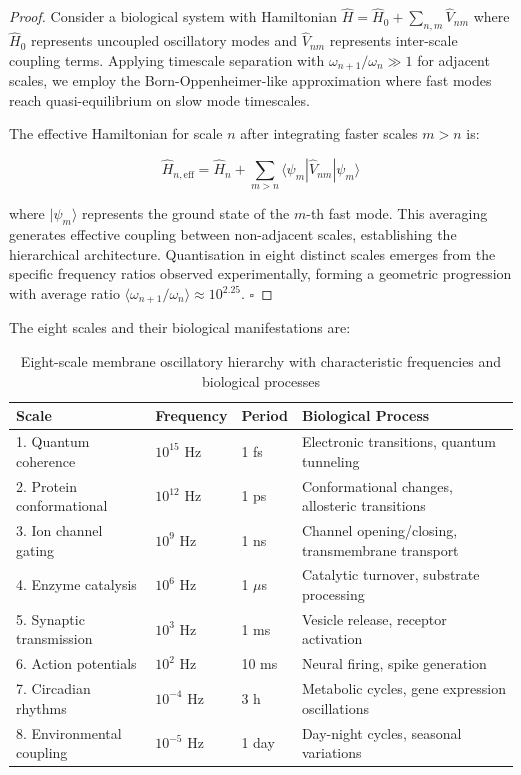 \documentclass{article}
\theoremstyle{definition}
\theoremstyle{remark}
\begin{document}
\begin{proof}
Consider a biological system with Hamiltonian $\hat{H} = \hat{H}_0 + \sum_{n,m} \hat{V}_{nm}$ where $\hat{H}_0$ represents uncoupled oscillatory modes and $\hat{V}_{nm}$ represents inter-scale coupling terms. Applying timescale separation with $\omega_{n+1}/\omega_n \gg 1$ for adjacent scales, we employ the Born-Oppenheimer-like approximation where fast modes reach quasi-equilibrium on slow mode timescales.

The effective Hamiltonian for scale $n$ after integrating faster scales $m > n$ is:

\begin{equation}
\hat{H}_{n,\text{eff}} = \hat{H}_n + \sum_{m>n} \langle \psi_m | \hat{V}_{nm} | \psi_m \rangle
\end{equation}

where $|\psi_m\rangle$ represents the ground state of the $m$-th fast mode. This averaging generates effective coupling between non-adjacent scales, establishing the hierarchical architecture. Quantisation in eight distinct scales emerges from the specific frequency ratios observed experimentally, forming a geometric progression with average ratio $\langle \omega_{n+1}/\omega_n \rangle \approx 10^{2.25}$. $\square$
\end{proof}


The eight scales and their biological manifestations are:

\begin{table}[h]
\centering
\caption{Eight-scale membrane oscillatory hierarchy with characteristic frequencies and biological processes}
\label{tab:oscillatory_scales}
\begin{tabular}{llll}
\toprule
\textbf{Scale} & \textbf{Frequency} & \textbf{Period} & \textbf{Biological Process} \\
\midrule
1. Quantum coherence & $10^{15}$ Hz & 1 fs & Electronic transitions, quantum tunneling \\
2. Protein conformational & $10^{12}$ Hz & 1 ps & Conformational changes, allosteric transitions \\
3. Ion channel gating & $10^{9}$ Hz & 1 ns & Channel opening/closing, transmembrane transport \\
4. Enzyme catalysis & $10^{6}$ Hz & 1 $\mu$s & Catalytic turnover, substrate processing \\
5. Synaptic transmission & $10^{3}$ Hz & 1 ms & Vesicle release, receptor activation \\
6. Action potentials & $10^{2}$ Hz & 10 ms & Neural firing, spike generation \\
7. Circadian rhythms & $10^{-4}$ Hz & 3 h & Metabolic cycles, gene expression oscillations \\
8. Environmental coupling & $10^{-5}$ Hz & 1 day & Day-night cycles, seasonal variations \\
\bottomrule
\end{tabular}
\end{table}
\end{document}

